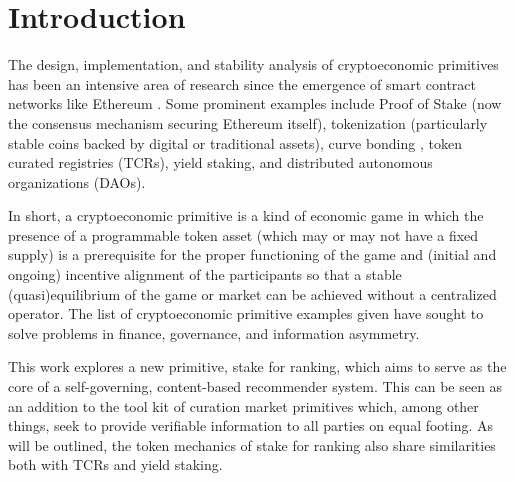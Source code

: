 \section{Introduction}

The design, implementation, and stability analysis of cryptoeconomic primitives \cite{horne2018crypto} has been an intensive area of research since the emergence of smart contract networks like Ethereum \cite{buterin2014next}. Some prominent examples include Proof of Stake \cite{quantum2011bitcoin} (now the consensus mechanism securing Ethereum itself), tokenization (particularly stable coins backed by digital or traditional assets), curve bonding \cite{graphBondingCurve}, token curated registries \cite{Goldin2018TCR} (TCRs), yield staking, and distributed autonomous organizations \cite{merkle2016daos} (DAOs). 

In short, a cryptoeconomic primitive is a kind of economic game in which the presence of a programmable token asset (which may or may not have a fixed supply) is a prerequisite for the proper functioning of the game and (initial and ongoing) incentive alignment of the participants so that a stable (quasi)equilibrium of the game or market can be achieved without a centralized operator. The list of cryptoeconomic primitive examples given have sought to solve problems in finance, governance, and information asymmetry. 

This work explores a new primitive, stake for ranking, which aims to serve as the core of a self-governing, content-based recommender system. This can be seen as an addition to the tool kit of curation market primitives which, among other things, seek to provide verifiable information to all parties on equal footing. As will be outlined, the token mechanics of stake for ranking also share similarities both with TCRs and yield staking. 